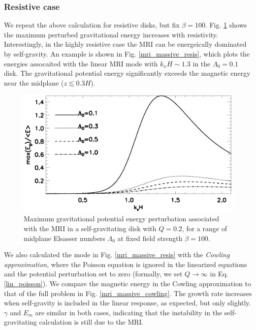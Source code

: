 \subsubsection{Resistive case}
We repeat the above calculation for resistive disks, but fix
$\beta=100$. Fig. \ref{gravity_energy_resis} shows the maximum
perturbed gravitational energy increases with 
resistivity. Interestingly, in the highly resistive case
the MRI can be energeically dominated by self-gravity. An example is shown in
Fig. \ref{mri_massive_resis}, which  plots the energies assocaited with the 
linear MRI mode with $k_xH\sim1.3$ in the $\Lambda_0=0.1$  
disk. The gravitational potential energy significantly exceeds the
magnetic energy near the midplane ($z\lesssim0.3H$).  

\begin{figure}
  \includegraphics[width=\linewidth]{figures/compare_energy_resis}
  \caption{Maximum gravitational potential energy perturbation
    associated with the MRI in a self-gravitating disk with $Q=0.2$,
    for a range of midplane Elsasser numbers $\Lambda_0$ at fixed
    field strength $\beta=100$.    
    \label{gravity_energy_resis}}
\end{figure}

We also calculated the mode in Fig. \ref{mri_massive_resis} with the \emph{Cowling 
  approximation}, where the Poisson equation is ignored in the 
linearized equations and the potential perturbation set to zero  
(formally, we set $Q\to\infty$ in Eq. \ref{lin_poisson}).  
We compare the magnetic energy in the Cowling approximation to that of
the full problem in Fig. \ref{mri_massive_cowling}. The growth rate
increases when self-gravity is included in the linear response, as
expected, but only slightly. $\gamma$ and $E_m$ are similar in both cases,
indicating that the instability in the self-gravitating calculation is
still due to the MRI.  





